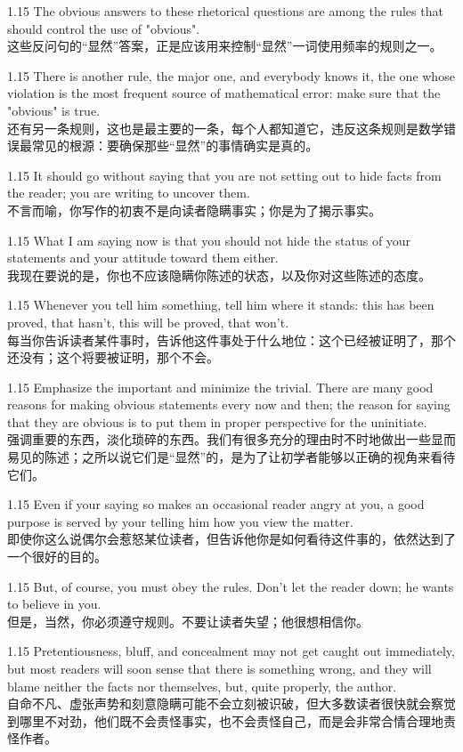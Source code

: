 \documentclass[12pt,a4paper]{article}
\newcommand{\bilingual}[2]{
    \begin{spacing}{1.15} %
        \noindent \normalsize #1 \\[-0.5ex] %
        \small \textcolor{blue!70!black}{#2} %
    \end{spacing}
    \vspace{0.8em} %
}
\begin{document}
\bilingual{The obvious answers to these rhetorical questions are among the rules that should control the use of "obvious".}
{这些反问句的“显然”答案，正是应该用来控制“显然”一词使用频率的规则之一。} %

\bilingual{There is another rule, the major one, and everybody knows it, the one whose violation is the most frequent source of mathematical error: make sure that the "obvious" is true.}
{还有另一条规则，这也是最主要的一条，每个人都知道它，违反这条规则是数学错误最常见的根源：要确保那些“显然”的事情确实是真的。} %

\bilingual{It should go without saying that you are not setting out to hide facts from the reader; you are writing to uncover them.}
{不言而喻，你写作的初衷不是向读者隐瞒事实；你是为了揭示事实。} %

\bilingual{What I am saying now is that you should not hide the status of your statements and your attitude toward them either.}
{我现在要说的是，你也不应该隐瞒你陈述的状态，以及你对这些陈述的态度。} %

\bilingual{Whenever you tell him something, tell him where it stands: this has been proved, that hasn't, this will be proved, that won't.}
{每当你告诉读者某件事时，告诉他这件事处于什么地位：这个已经被证明了，那个还没有；这个将要被证明，那个不会。} %

\bilingual{Emphasize the important and minimize the trivial. There are many good reasons for making obvious statements every now and then; the reason for saying that they are obvious is to put them in proper perspective for the uninitiate.}
{强调重要的东西，淡化琐碎的东西。我们有很多充分的理由时不时地做出一些显而易见的陈述；之所以说它们是“显然”的，是为了让初学者能够以正确的视角来看待它们。} %

\bilingual{Even if your saying so makes an occasional reader angry at you, a good purpose is served by your telling him how you view the matter.}
{即使你这么说偶尔会惹怒某位读者，但告诉他你是如何看待这件事的，依然达到了一个很好的目的。} %

\bilingual{But, of course, you must obey the rules. Don't let the reader down; he wants to believe in you.}
{但是，当然，你必须遵守规则。不要让读者失望；他很想相信你。} %

\bilingual{Pretentiousness, bluff, and concealment may not get caught out immediately, but most readers will soon sense that there is something wrong, and they will blame neither the facts nor themselves, but, quite properly, the author.}
{自命不凡、虚张声势和刻意隐瞒可能不会立刻被识破，但大多数读者很快就会察觉到哪里不对劲，他们既不会责怪事实，也不会责怪自己，而是会非常合情合理地责怪作者。} %
\end{document}
